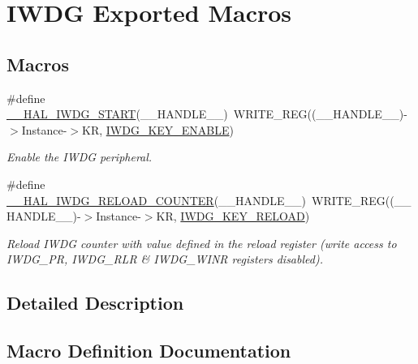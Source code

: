 \hypertarget{group___i_w_d_g___exported___macros}{}\section{I\+W\+DG Exported Macros}
\label{group___i_w_d_g___exported___macros}
\subsection*{Macros}
\begin{DoxyCompactItemize}
\item 
\#define \hyperlink{group___i_w_d_g___exported___macros_ga5914aff5b85e3151bb75377a32d83d6a}{\+\_\+\+\_\+\+H\+A\+L\+\_\+\+I\+W\+D\+G\+\_\+\+S\+T\+A\+RT}(\+\_\+\+\_\+\+H\+A\+N\+D\+L\+E\+\_\+\+\_\+)~W\+R\+I\+T\+E\+\_\+\+R\+EG((\+\_\+\+\_\+\+H\+A\+N\+D\+L\+E\+\_\+\+\_\+)-\/$>$Instance-\/$>$KR, \hyperlink{group___i_w_d_g___private___constants_ga493295d56bb62752982234755612386f}{I\+W\+D\+G\+\_\+\+K\+E\+Y\+\_\+\+E\+N\+A\+B\+LE})
\begin{DoxyCompactList}\small\item\em Enable the I\+W\+DG peripheral. \end{DoxyCompactList}\item 
\#define \hyperlink{group___i_w_d_g___exported___macros_gac0eaf381e60a654d6b51c43f645e088f}{\+\_\+\+\_\+\+H\+A\+L\+\_\+\+I\+W\+D\+G\+\_\+\+R\+E\+L\+O\+A\+D\+\_\+\+C\+O\+U\+N\+T\+ER}(\+\_\+\+\_\+\+H\+A\+N\+D\+L\+E\+\_\+\+\_\+)~W\+R\+I\+T\+E\+\_\+\+R\+EG((\+\_\+\+\_\+\+H\+A\+N\+D\+L\+E\+\_\+\+\_\+)-\/$>$Instance-\/$>$KR, \hyperlink{group___i_w_d_g___private___constants_ga33abf7b7c76dfda6b6380448a1d28966}{I\+W\+D\+G\+\_\+\+K\+E\+Y\+\_\+\+R\+E\+L\+O\+AD})
\begin{DoxyCompactList}\small\item\em Reload I\+W\+DG counter with value defined in the reload register (write access to I\+W\+D\+G\+\_\+\+PR, I\+W\+D\+G\+\_\+\+R\+LR \& I\+W\+D\+G\+\_\+\+W\+I\+NR registers disabled). \end{DoxyCompactList}\end{DoxyCompactItemize}


\subsection{Detailed Description}


\subsection{Macro Definition Documentation}
\mbox{\label{group___i_w_d_g___exported___macros_gac0eaf381e60a654d6b51c43f645e088f}} 
